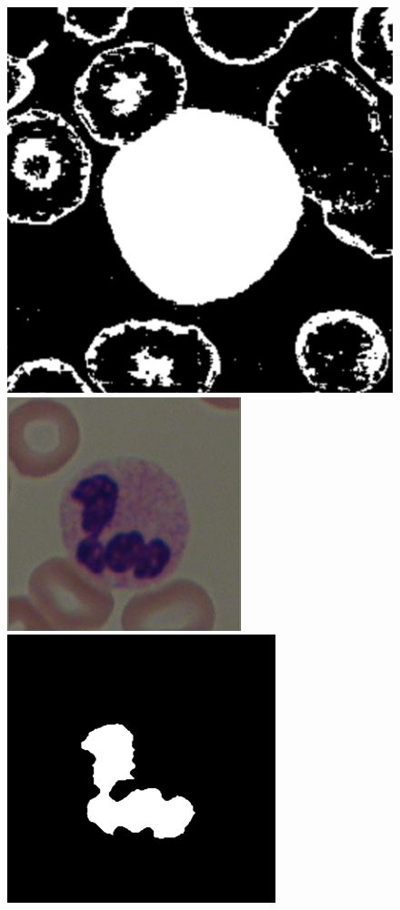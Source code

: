 \documentclass[final,a4paper,12pt,english]{UnicaPhdThesis3}
\begin{document}
\begin{figure}[!b]
		\includegraphics[height=0.10\textheight, width=0.10\textheight]{images/2015_1_caip/1-3}\vspace{1mm}
		\includegraphics[height=0.10\textheight, width=0.10\textheight]{images/2015_1_caip/2-1}
		\includegraphics[height=0.10\textheight, width=0.10\textheight]{images/2015_1_caip/2-3}

\end{figure}
\end{document}

